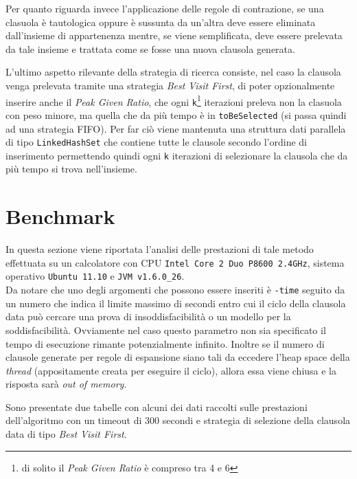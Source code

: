 \documentclass[a4paper,11pt]{article}
\begin{document}
Per quanto riguarda invece l'applicazione delle regole di contrazione, se una clasuola è tautologica oppure è sussunta da un'altra deve essere eliminata dall'insieme di appartenenza mentre, se viene semplificata, deve essere prelevata da tale insieme e trattata come se fosse una nuova clausola generata.\par
L'ultimo aspetto rilevante della strategia di ricerca consiste, nel caso la clausola venga prelevata tramite una strategia \emph{Best Visit First}, di poter opzionalmente inserire anche il \emph{Peak Given Ratio}, che ogni \texttt{k}\footnote{di solito il \emph{Peak Given Ratio} è compreso tra 4 e 6} iterazioni preleva non la clasuola con peso minore, ma quella che da più tempo è in \texttt{toBeSelected} (si passa quindi ad una strategia FIFO). Per far ciò viene mantenuta una struttura dati parallela di tipo \texttt{LinkedHashSet} che contiene tutte le clausole secondo l'ordine di inserimento permettendo quindi ogni \texttt{k} iterazioni di selezionare la clausola che da più tempo si trova nell'insieme.

\section{Benchmark}
In questa sezione viene riportata l'analisi delle prestazioni di tale metodo effettuata su un calcolatore con CPU \texttt{Intel Core 2 Duo P8600 2.4GHz}, sistema operativo \texttt{Ubuntu 11.10} e \texttt{JVM v1.6.0\_26}.\\
Da notare che uno degli argomenti che possono essere inseriti è \texttt{-time} seguito da un numero che indica il limite massimo di secondi entro cui il ciclo della clausola data può cercare una prova di insoddisfacibilità o un modello per la soddisfacibilità. Ovviamente nel caso questo parametro non sia specificato il tempo di esecuzione rimante potenzialmente infinito. Inoltre se il numero di clausole generate per regole di espansione siano tali da eccedere l'heap space della \emph{thread} (appositamente creata per eseguire il ciclo), allora essa viene chiusa e la risposta sarà \emph{out of memory}.\par
Sono presentate due tabelle con alcuni dei dati raccolti sulle prestazioni dell'algoritmo con un timeout di 300 secondi e  strategia di selezione della clausola data di tipo \emph{Best Visit First}.
\end{document}
